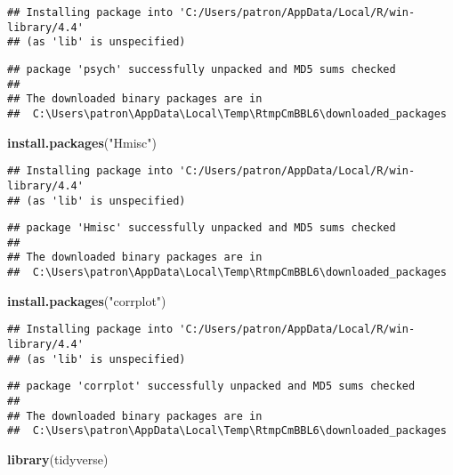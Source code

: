 \documentclass[
]{article}
\newenvironment{Shaded}{\begin{snugshade}}{\end{snugshade}}
\newcommand{\FunctionTok}[1]{\textcolor[rgb]{0.13,0.29,0.53}{\textbf{#1}}}
\newcommand{\NormalTok}[1]{#1}
\newcommand{\StringTok}[1]{\textcolor[rgb]{0.31,0.60,0.02}{#1}}
\begin{document}
\begin{verbatim}
## Installing package into 'C:/Users/patron/AppData/Local/R/win-library/4.4'
## (as 'lib' is unspecified)
\end{verbatim}

\begin{verbatim}
## package 'psych' successfully unpacked and MD5 sums checked
## 
## The downloaded binary packages are in
##  C:\Users\patron\AppData\Local\Temp\RtmpCmBBL6\downloaded_packages
\end{verbatim}

\begin{Shaded}
\begin{Highlighting}[]
\FunctionTok{install.packages}\NormalTok{(}\StringTok{"Hmisc"}\NormalTok{)}
\end{Highlighting}
\end{Shaded}

\begin{verbatim}
## Installing package into 'C:/Users/patron/AppData/Local/R/win-library/4.4'
## (as 'lib' is unspecified)
\end{verbatim}

\begin{verbatim}
## package 'Hmisc' successfully unpacked and MD5 sums checked
## 
## The downloaded binary packages are in
##  C:\Users\patron\AppData\Local\Temp\RtmpCmBBL6\downloaded_packages
\end{verbatim}

\begin{Shaded}
\begin{Highlighting}[]
\FunctionTok{install.packages}\NormalTok{(}\StringTok{"corrplot"}\NormalTok{)}
\end{Highlighting}
\end{Shaded}

\begin{verbatim}
## Installing package into 'C:/Users/patron/AppData/Local/R/win-library/4.4'
## (as 'lib' is unspecified)
\end{verbatim}

\begin{verbatim}
## package 'corrplot' successfully unpacked and MD5 sums checked
## 
## The downloaded binary packages are in
##  C:\Users\patron\AppData\Local\Temp\RtmpCmBBL6\downloaded_packages
\end{verbatim}

\begin{Shaded}
\begin{Highlighting}[]
\FunctionTok{library}\NormalTok{(tidyverse)}
\end{Highlighting}
\end{Shaded}
\end{document}
